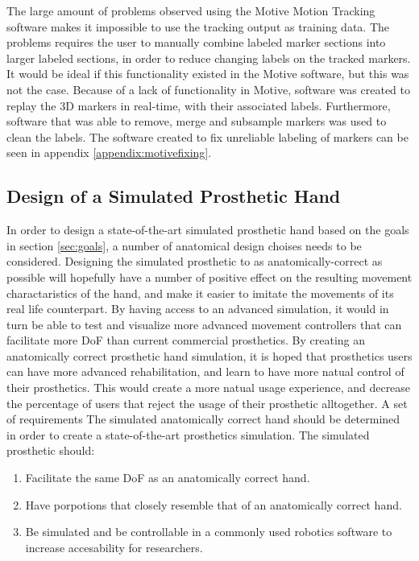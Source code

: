 \documentclass[../main.tex]{subfiles}
\begin{document}
The large amount of problems observed using the Motive Motion Tracking software makes it impossible to use the tracking output as training data.
The problems requires the user to manually combine labeled marker sections into larger labeled sections, in order to reduce changing labels on the tracked markers.
It would be ideal if this functionality existed in the Motive software, but this was not the case.
Because of a lack of functionality in Motive, software was created to replay the 3D markers in real-time, with their associated labels.
Furthermore, software that was able to remove, merge and subsample markers was used to clean the labels.
The software created to fix unreliable labeling of markers can be seen in appendix \ref{appendix:motivefixing}.

\subsection{Design of a Simulated Prosthetic Hand}
\label{sec:prost_sim}

In order to design a state-of-the-art simulated prosthetic hand based on the goals in section \ref{sec:goals}, a number of anatomical design choises needs to be considered.
Designing the simulated prosthetic to as anatomically-correct as possible will hopefully have a number of positive effect on the resulting movement charactaristics of the hand, and make it easier to imitate the movements of its real life counterpart.
By having access to an advanced simulation, it would in turn be able to test and visualize more advanced movement controllers that can facilitate more DoF than current commercial prosthetics. 
By creating an anatomically correct prosthetic hand simulation, it is hoped that prosthetics users can have more advanced rehabilitation, and learn to have more natual control of their prosthetics. This would create a more natual usage experience, and decrease the percentage of users that reject the usage of their prosthetic alltogether.
A set of requirements The simulated anatomically correct hand should be determined in order to create a state-of-the-art prosthetics simulation.
The simulated prosthetic should:

\begin{enumerate}
\item Facilitate the same DoF as an anatomically correct hand.
\item Have porpotions that closely resemble that of an anatomically correct hand.
\item Be simulated and be controllable in a commonly used robotics software to increase accesability for researchers.
\end{enumerate}
\end{document}
